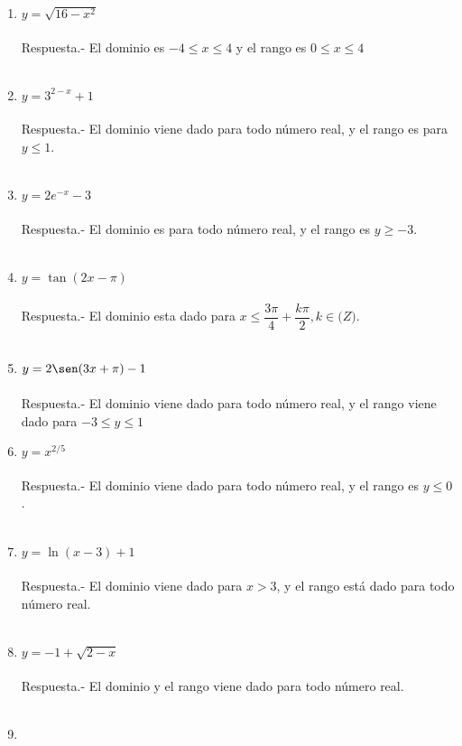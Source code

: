 \begin{enumerate}[\bfseries 1.]
\item $y=\sqrt{16-x^2}$\\\\
    Respuesta.-\; El dominio es $-4\leq x \leq 4$ y el rango es $0\leq x \leq 4$\\\\

\item $y=3^{2-x}+1$\\\\
    Respuesta.-\; El dominio viene dado para todo número real, y el rango es para $y\leq 1$.\\\\

\item $y=2e^{-x} - 3$\\\\
    Respuesta.-\; El dominio es para todo número real, y el rango es $y\geq -3$.\\\\

\item $y=\tan(2x-\pi)$\\\\
    Respuesta.-\; El dominio esta dado para $x\leq \dfrac{3\pi}{4} + \dfrac{k\pi}{2}, k\in \mathbb(Z)$.\\\\

\item $y=2\sen(3x+\pi)-1$\\\\
    Respuesta.-\; El dominio viene dado para todo número real, y el rango viene dado para $-3\leq y \leq 1$

\item $y=x^{2/5}$\\\\
    Respuesta.-\; El dominio viene dado para todo número real, y el rango es $y\leq 0$.\\\\

\item $y=\ln(x-3)+1$\\\\
    Respuesta.-\; El dominio viene dado para $x>3$, y el rango está dado para todo número real.\\\\

\item $y=-1+\sqrt{2-x}$\\\\
    Respuesta.-\; El dominio y el rango viene dado para todo número real.\\\\

\item 

\end{enumerate}

